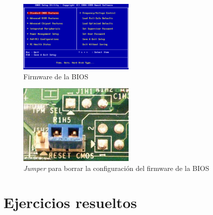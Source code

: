 \documentclass[12pt,spanish]{article}
\begin{document}
\begin{figure}[H]
	\centering
	\includegraphics[width=0.5\textwidth]{bios.png}
	\caption{Firmware de la BIOS}
\end{figure}

\begin{figure}[H]
	\centering
	\includegraphics[width=0.5\textwidth]{jumper.jpg}
	\caption{\textit{Jumper} para borrar la configuración del firmware de la BIOS}
\end{figure}


\section{Ejercicios resueltos}
\end{document}

